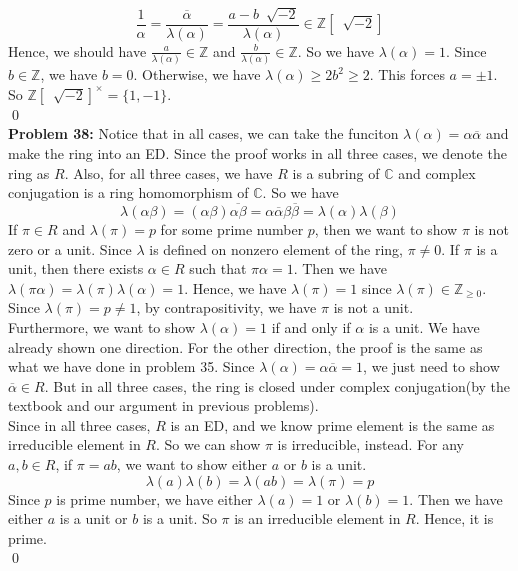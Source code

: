 \documentclass[12pt]{amsart}
\newcommand{\C}{\mathbb{C}}
\newcommand{\Z}{\mathbb{Z}}
\begin{document}
\[\frac{1}{\alpha}=\frac{\overline{\alpha}}{\lambda(\alpha)}=\frac{a-b\  \sqrt[]{-2}}{\lambda(\alpha)}\in \Z[\ \sqrt[]{-2}]\]
Hence, we should have $\frac{a}{\lambda(\alpha)}\in \Z$ and $\frac{b}{\lambda(\alpha)}\in \Z$. So we have $\lambda(\alpha)= 1$. Since $b\in \Z$, we have $b=0$. Otherwise, we have $\lambda(\alpha)\geq 2b^2\geq 2$. This forces $a=\pm 1$. So $\Z[\ \sqrt[]{-2}]^\times =\{1,-1\}$.
\\\qed\\
\textbf{Problem 38:} Notice that in all cases, we can take the funciton $\lambda(\alpha)=\alpha\overline{\alpha}$ and make the ring into an ED. Since the proof works in all three cases, we denote the ring as $R$. Also, for all three cases, we have $R$ is a subring of $\C$ and complex conjugation is a ring homomorphism of $\C$. So we have 
\[\lambda(\alpha\beta)=(\alpha\beta)\overline{\alpha\beta}=\alpha\overline{\alpha}\beta\overline{\beta}=\lambda(\alpha) \lambda(\beta)\] 
If $\pi\in R$ and $\lambda(\pi)=p$ for some prime number $p$, then we want to show $\pi$ is not zero or a unit. Since $\lambda$ is defined on nonzero element of the ring, $\pi\neq 0$. If $\pi$ is a unit, then there exists $\alpha\in R$ such that $\pi\alpha=1$. Then we have $\lambda(\pi\alpha)=\lambda(\pi)\lambda(\alpha)=1$. Hence, we have $\lambda(\pi)=1$ since $\lambda(\pi)\in\Z_{\geq 0}$. Since $\lambda(\pi)=p\neq 1$, by contrapositivity, we have $\pi$ is not a unit.\\
Furthermore, we want to show $\lambda(\alpha)=1$ if and only if $\alpha$ is a unit. We have already shown one direction. For the other direction, the proof is the same as what we have done in problem 35. Since $\lambda(\alpha)=\alpha\overline{\alpha}=1$, we just need to show $\overline{\alpha}\in R$. But in all three cases, the ring is closed under complex conjugation(by the textbook and our argument in previous problems). \\
Since in all three cases, $R$ is an ED, and we know prime element is the same as irreducible element in $R$. So we can show $\pi$ is irreducible, instead. For any $a,b\in R$, if $\pi= ab$, we want to show either $a$ or $b$ is a unit.\\
\[\lambda(a)\lambda(b)=\lambda(ab)=\lambda(\pi)=p\]
Since $p$ is prime number, we have either $\lambda(a)=1$ or $\lambda(b)=1$. Then we have either $a$ is a unit or $b$ is a unit. So $\pi$ is an irreducible element in $R$. Hence, it is prime.
\\\qed\\
\end{document}
